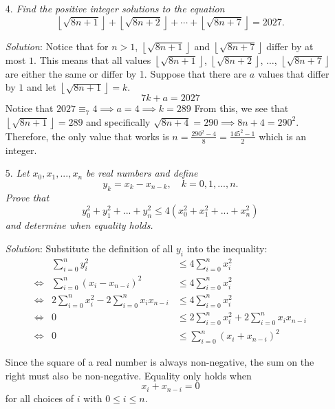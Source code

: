 \documentclass{article}
\begin{document}
\begin{enumerate}[1.]
\item[4.] %
\newcommand{\floorsqrt}[1]{\left\lfloor\sqrt{#1}\right\rfloor} 
\textit{
Find the positive integer solutions to the equation
\[ \floorsqrt{8n+1} +\floorsqrt{8n+2} +\dotsb +\floorsqrt{8n+7} = 2027. \]}

\textit{Solution}:
Notice that for $n > 1$, $\floorsqrt{8n + 1}$ and $\floorsqrt{8n + 7}$ differ by at most $1$. This means that all values $\floorsqrt{8n + 1}$, $\floorsqrt{8n + 2}$, $\dots$, $\floorsqrt{8n + 7}$ are either the same or differ by 1. Suppose that there are $a$ values that differ by $1$ and let $\floorsqrt{8n + 1} = k$.
$$7k + a = 2027$$
Notice that $2027 \equiv _7 4 \implies a = 4 \implies k = 289$ From this, we see that $\floorsqrt{8n + 1} = 289$ and specifically $\sqrt{8n + 4} = 290 \implies 8n + 4 = 290^2$. Therefore, the only value that works is $n = \frac{290^2 - 4}{8} = \frac{145^2 - 1}{2}$ which is an integer.

\item[5.] %
\textit{
Let $x_0, x_1,..., x_n$ be real numbers and define
\[y_k=x_k-x_{n-k}, \quad k=0,1,...,n.\]
Prove that 
\[y_0^2 + y_1^2+...+ y_n^2 \leq 4(x_0^2 + x_1^2 + ... + x_n^2) \]
and determine when equality holds.
}

\textit{Solution}: 
Substitute the definition of all $y_i$ into the inequality:
\begin{align*}
  &&\sum_{i = 0}^{n}y_i^2 &\leq 4\sum_{i = 0}^{n}x_i^2 &\\
  &\iff& \sum_{i = 0}^{n}(x_i - x_{n - i})^2 &\leq 4\sum_{i = 0}^{n}x_i^2 &\\
  &\iff& 2\sum_{i = 0}^{n}x_i^2 - 2\sum_{i = 0}^{n}x_ix_{n - i} &\leq 4\sum_{i = 0}^{n}x_i^2& \\
  &\iff& 0 &\leq 2\sum_{i = 0}^{n}x_i^2 + 2\sum_{i = 0}^{n}x_ix_{n - i} \\
  &\iff& 0 &\leq \sum_{i = 0}^{n}(x_i + x_{n - i})^2 &
\end{align*}

Since the square of a real number is always non-negative, the sum on the right must also be non-negative. Equality only holds when
$$x_i + x_{n - i} = 0$$
for all choices of $i$ with $0 \le i \le n$.

\end{enumerate}
\end{document}
